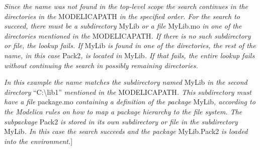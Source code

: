 \documentclass[../MLS.tex]{subfiles}
\begin{document}
\emph{Since the name was not found in the top-level scope the search
continues in the directories in the} MODELICAPATH \emph{in the specified
order. For the search to succeed, there must be a subdirectory} MyLib
\emph{or a file} MyLib.mo \emph{in one of the directories mentioned in
the} MODELICAPATH\emph{. If there is no such subdirectory or file, the
lookup fails. If} MyLib \emph{is found in one of the directories, the
rest of the name, in this case} Pack2\emph{, is located in} MyLib\emph{.
If that fails, the entire lookup fails without continuing the search in
possibly remaining directories.}

\emph{In this example the name matches the subdirectory named} MyLib
\emph{in the second directory} ``C:\textbackslash{}lib1''
\emph{mentioned in the} MODELICAPATH\emph{. This subdirectory must have
a file} package.mo \emph{containing a definition of the package}
MyLib\emph{, according to the Modelica rules on how to map a package
hierarchy to the file system. The subpackage} Pack2 \emph{is stored in
its own subdirectory or file in the subdirectory} MyLib\emph{. In this
case the search succeeds and the package} MyLib.Pack2 \emph{is loaded
into the environment.}{]}
\end{document}
